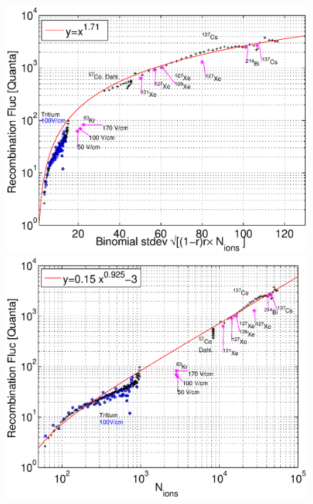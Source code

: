 \begin{figure}[h!]\centering
\includegraphics[width=120mm]{Chapter_Flucs/Figures/alpha/bino_amp_100_iter1.eps}
\includegraphics[width=120mm]{Chapter_Flucs/Figures/alpha/R_v_Ni_100_iter1.eps}
\caption{ }
\label{fig:R_Big}
\end{figure}
